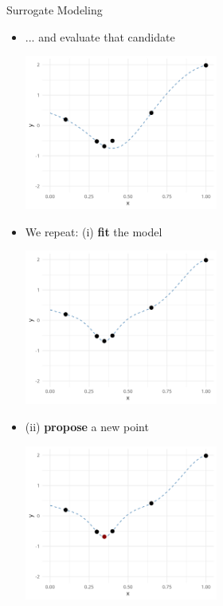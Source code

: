 \documentclass[11pt,compress,t,notes=noshow, xcolor=table]{beamer}
\begin{document}
\begin{vbframe}{Surrogate Modeling}
\begin{itemize}
\framebreak

\item ... and evaluate that candidate
\vspace{+.45cm}

\begin{center}
  \includegraphics[width = 0.5\textwidth]{figure_man/loop_6.png}
\end{center}

\framebreak

\item We repeat: (i) \textbf{fit} the model
\vspace{+.45cm}

\begin{center}
  \includegraphics[width = 0.5\textwidth]{figure_man/loop_7.png}
\end{center}

\framebreak

\item (ii) \textbf{propose} a new point
\vspace{+.45cm}

\begin{center}
  \includegraphics[width = 0.5\textwidth]{figure_man/loop_8.png}
\end{center}


\end{itemize}
\end{vbframe}
\end{document}
